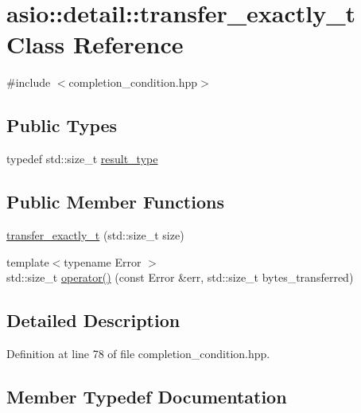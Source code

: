 \hypertarget{classasio_1_1detail_1_1transfer__exactly__t}{}\section{asio\+:\+:detail\+:\+:transfer\+\_\+exactly\+\_\+t Class Reference}
\label{classasio_1_1detail_1_1transfer__exactly__t}


{\ttfamily \#include $<$completion\+\_\+condition.\+hpp$>$}

\subsection*{Public Types}
\begin{DoxyCompactItemize}
\item 
typedef std\+::size\+\_\+t \hyperlink{classasio_1_1detail_1_1transfer__exactly__t_a6d16742df4d96f69895c3a0d36df88b7}{result\+\_\+type}
\end{DoxyCompactItemize}
\subsection*{Public Member Functions}
\begin{DoxyCompactItemize}
\item 
\hyperlink{classasio_1_1detail_1_1transfer__exactly__t_a2f026854a1ee10848f0a26927ae8222b}{transfer\+\_\+exactly\+\_\+t} (std\+::size\+\_\+t size)
\item 
{\footnotesize template$<$typename Error $>$ }\\std\+::size\+\_\+t \hyperlink{classasio_1_1detail_1_1transfer__exactly__t_a699ae9d24f60c1e6e159b525e0ffc081}{operator()} (const Error \&err, std\+::size\+\_\+t bytes\+\_\+transferred)
\end{DoxyCompactItemize}


\subsection{Detailed Description}


Definition at line 78 of file completion\+\_\+condition.\+hpp.



\subsection{Member Typedef Documentation}
\hypertarget{classasio_1_1detail_1_1transfer__exactly__t_a6d16742df4d96f69895c3a0d36df88b7}{}
